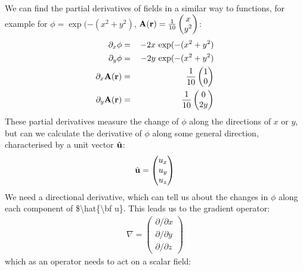 \documentclass[letterpaper,10pt,english]{jupyterBook}
\begin{document}
\sphinxAtStartPar
We can find the partial derivatives of fields in a similar way to functions, for example for \(\phi = \exp(-(x^2+y^2)\), \({\bf A(r)} = \frac{1}{10}\begin{pmatrix}
 x\\
 y^2
\end{pmatrix}\):
\begin{equation*}
\begin{split}\partial_x \phi &=&\, -2x\,\exp(-(x^2+y^2) \\
\partial_y \phi &=&\, -2y\,\exp(-(x^2+y^2) \\
\partial_x {\bf A(r)} &=&\, \frac{1}{10}\begin{pmatrix}
 1\\
 0
\end{pmatrix} \\
\partial_y {\bf A(r)} &=&\, \frac{1}{10}\begin{pmatrix}
 0\\
 2y
\end{pmatrix} \end{split}
\end{equation*}
\sphinxAtStartPar
These partial derivatives measure the change of \(\phi\) along the directions of \(x\) or \(y\), but can we calculate the derivative of \(\phi\) along some
general direction, characterised by a unit vector \(\hat{\bf u}\):
\begin{equation*}
\begin{split}\hat{\bf u} = \begin{pmatrix}
 u_x\\
 u_y\\
 u_z
\end{pmatrix} \end{split}
\end{equation*}
\sphinxAtStartPar
We need a directional derivative, which can tell us about the changes in \(\phi\) along each component of \$\textbackslash{}hat\{\textbackslash{}bf u\}.  This leads us to the gradient
operator:
\begin{equation*}
\begin{split}\nabla = \begin{pmatrix}
 \partial/\partial x \\
 \partial/\partial y \\
 \partial/\partial z 
\end{pmatrix} \end{split}
\end{equation*}
\sphinxAtStartPar
which as an operator needs to act on a scalar field:
\end{document}
